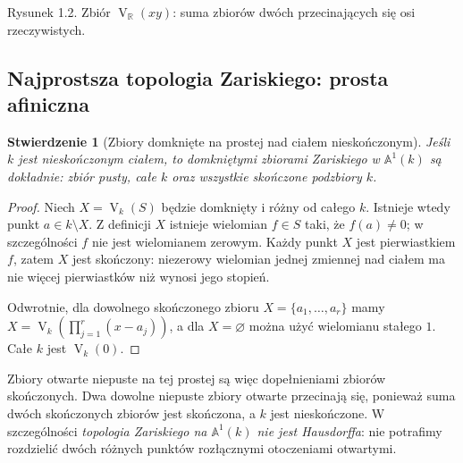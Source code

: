 \documentclass[11pt,a4paper,openany]{report}
\numberwithin{equation}{section}
\theoremstyle{plain}
\newtheorem{stwierdzenie}[twierdzenie]{Stwierdzenie}
\theoremstyle{definition}
\theoremstyle{remark}
\newcommand{\R}{\mathbb R}
\newcommand{\A}{\mathbb A}
\newcommand{\V}{\operatorname V}
\begin{document}
\begin{center}
\end{center}
\begin{center}\small Rysunek 1.2. Zbiór $\V_{\R}(xy)$: suma zbiorów dwóch przecinających się osi rzeczywistych.\end{center}

\subsection{Najprostsza topologia Zariskiego: prosta afiniczna}

\begin{stwierdzenie}[Zbiory domknięte na prostej nad ciałem nieskończonym]
\label{st:A1-top}
Jeśli $k$ jest nieskończonym ciałem, to domkniętymi zbiorami
Zariskiego w $\A^1(k)$ są dokładnie: zbiór pusty, całe $k$
oraz wszystkie skończone podzbiory $k$.
\end{stwierdzenie}
\begin{proof}
Niech $X=\V_k(S)$ będzie domknięty i różny od całego $k$.
Istnieje wtedy punkt $a\in k\setminus X$. Z definicji $X$
istnieje wielomian $f\in S$ taki, że $f(a)\ne0$;
w szczególności $f$ nie jest wielomianem zerowym.
Każdy punkt $X$ jest pierwiastkiem $f$, zatem $X$ jest skończony:
niezerowy wielomian jednej zmiennej nad ciałem ma nie więcej
pierwiastków niż wynosi jego stopień.

Odwrotnie, dla dowolnego skończonego zbioru
$X=\{a_1,\dots,a_r\}$ mamy
$X=\V_k(\prod_{j=1}^r(x-a_j))$, a dla $X=\varnothing$
można użyć wielomianu stałego $1$. Całe $k$ jest $\V_k(0)$.
\end{proof}

Zbiory otwarte niepuste na tej prostej są więc dopełnieniami
zbiorów skończonych. Dwa dowolne niepuste zbiory otwarte przecinają się,
ponieważ suma dwóch skończonych zbiorów jest skończona, a $k$ jest
nieskończone. W szczególności \emph{topologia Zariskiego na $\A^1(k)$
nie jest Hausdorffa}: nie potrafimy rozdzielić dwóch różnych punktów
rozłącznymi otoczeniami otwartymi.
\end{document}
